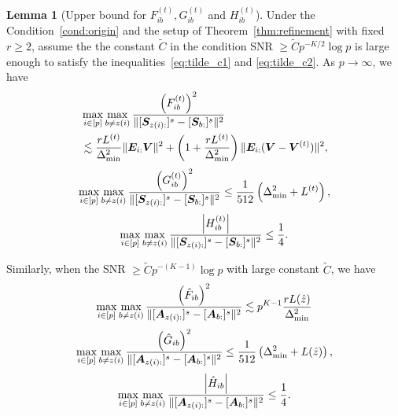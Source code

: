\documentclass[journal]{IEEEtran}
\theoremstyle{definition}
\newtheorem{lem}{Lemma}
\theoremstyle{definition}
\newcommand{\of}[1]{\left(#1\right)}
\newcommand{\aabs}[1]{\left|#1\right|}
\begin{document}
\begin{lem}[Upper bound for $F_{ib}^{(t)}, G_{ib}^{(t)}$ and $H_{ib}^{(t)}$]\label{lem:upper_fgh} Under the Condition~\ref{cond:origin} and the setup of Theorem~\ref{thm:refinement}  {with fixed $r \geq 2$},  assume the the constant $\tilde C$ in the condition SNR $\geq \tilde C p^{-K/2} \log p$ is large enough to satisfy the inequalities~\eqref{eq:tilde_c1} and \eqref{eq:tilde_c2}. {As $p \rightarrow \infty$}, we have 
\small
\begin{align}
    &\max_{i \in [p]} \max_{b \neq z(i)} \frac{\of{F_{ib}^{(t)}}^2}{ \onormSize{}{ [  \mS_{z(i):} ]^s  -  [ \mS_{b:} ]^s }^2 } \\
    &\lesssim  \frac{r L^{(t)}}{ \Delta_{\min}^2} \onormSize{}{\mE_{i:} \mV}^2 + \of{1 +  \frac{ r L^{(t)}}{ \Delta_{\min}^2}} \onormSize{}{\mE_{i:} (\mV - \mV^{(t)})}^2 ,\label{eq:fib}
\end{align}
    \begin{equation}\label{eq:gib}
        \max_{i \in [p]} \max_{b \neq z(i)} \frac{ \of{  G_{ib}^{(t)} }^2  }{ \onormSize{}{ [\mS_{z(i):} ]^s - [\mS_{b:}]^s }^2}  \leq  \frac{1}{512} \of{ \Delta_{\min}^2 +L^{(t)}},
    \end{equation}
    \begin{equation}\label{eq:hib}
        \max_{i \in [p]} \max_{b \neq z(i)}  \frac{ \aabs{  H_{ib}^{(t)} }  }{ \onormSize{}{ [\mS_{z(i):} ]^s - [\mS_{b:}]^s }^2} \leq \frac{1}{4}.
    \end{equation}
    \normalsize
    
    Similarly, when the SNR $\geq \tilde C p^{-(K-1)}\log p$ with large constant $\tilde C$, we have 
    \small
     \begin{equation}\label{eq:fib_cor}
        \max_{i \in [p]} \max_{b \neq z(i)} \frac{\of{\hat F_{ib}}^2}{ \onormSize{}{ [  \mA_{z(i):} ]^s  -  [ \mA_{b:} ]^s }^2 } \lesssim p^{K-1} \frac{r L(\hat z)}{ \Delta_{\min}^2}
    \end{equation}
    \begin{equation}\label{eq:gib_cor}
        \max_{i \in [p]} \max_{b \neq z(i)} \frac{ \of{  \hat G_{ib} }^2  }{ \onormSize{}{ [\mA_{z(i):} ]^s - [\mA_{b:}]^s }^2}  \leq  \frac{1}{512} \of{ \Delta_{\min}^2 +L(\hat z)},
    \end{equation}
    \begin{equation}\label{eq:hib_cor}
        \max_{i \in [p]} \max_{b \neq z(i)}  \frac{ \aabs{  \hat H_{ib} }  }{ \onormSize{}{ [\mA_{z(i):} ]^s - [\mA_{b:}]^s }^2} \leq \frac{1}{4}.
    \end{equation}
    \end{lem}
    \normalsize
\end{document}
